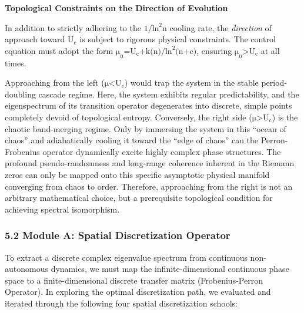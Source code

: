 \textbf{Topological Constraints on the Direction of Evolution}

In addition to strictly adhering to the
\(\text{1/}\text{ln}^{\text{2}}\text{n}\) cooling rate, the
\emph{direction} of approach toward \(\text{U}_{\text{c}}\) is subject
to rigorous physical constraints. The control equation must adopt the
form
\(\text{μ}_{\text{n}}\text{=}\text{U}_{\text{c}}\text{+}\text{k}\text{(}\text{n}\text{)/}\text{ln}^{\text{2}}\text{(}\text{n}\text{+}\text{c}\text{)}\),
ensuring \(\text{μ}_{\text{n}}\text{>}\text{U}_{\text{c}}\) at all
times.

Approaching from the left (\(\text{μ}\text{<}\text{U}_{\text{c}}\))
would trap the system in the stable period-doubling cascade regime.
Here, the system exhibits regular predictability, and the eigenspectrum
of its transition operator degenerates into discrete, simple points
completely devoid of topological entropy. Conversely, the right side
(\(\text{μ}\text{>}\text{U}_{\text{c}}\)) is the chaotic band-merging
regime. Only by immersing the system in this ``ocean of chaos'' and
adiabatically cooling it toward the ``edge of chaos'' can the
Perron-Frobenius operator dynamically excite highly complex phase
structures. The profound pseudo-randomness and long-range coherence
inherent in the Riemann zeros can only be mapped onto this specific
asymptotic physical manifold converging from chaos to order. Therefore,
approaching from the right is not an arbitrary mathematical choice, but
a prerequisite topological condition for achieving spectral isomorphism.

\hypertarget{module-a-spatial-discretization-operator}{%
\subsubsection{\texorpdfstring{\textbf{5.2 Module A: Spatial
Discretization
Operator}}{5.2 Module A: Spatial Discretization Operator}}\label{module-a-spatial-discretization-operator}}

To extract a discrete complex eigenvalue spectrum from continuous
non-autonomous dynamics, we must map the infinite-dimensional continuous
phase space to a finite-dimensional discrete transfer matrix
(Frobenius-Perron Operator). In exploring the optimal discretization
path, we evaluated and iterated through the following four spatial
discretization schools:

